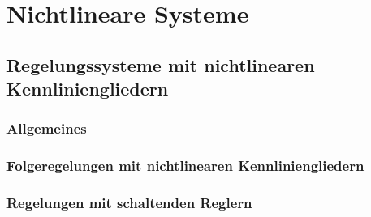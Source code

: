 \section{Nichtlineare Systeme}


\subsection{Regelungssysteme mit nichtlinearen Kennliniengliedern}


\subsubsection{Allgemeines}


\subsubsection{Folgeregelungen mit nichtlinearen Kennliniengliedern}


\subsubsection{Regelungen mit schaltenden Reglern}
